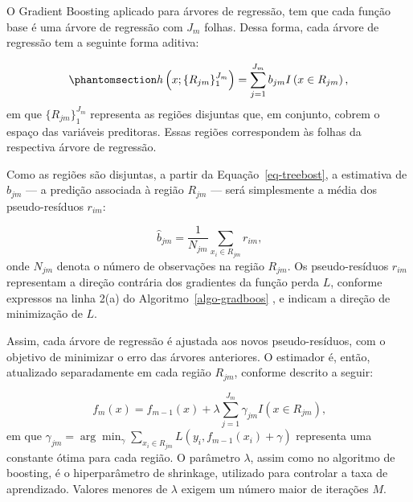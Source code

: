 \documentclass[
  12pt,
  a4paper,
]{scrreprt}
\begin{document}
\vspace{12pt}

O Gradient Boosting aplicado para árvores de regressão, tem que cada
função base é uma árvore de regressão com \(J_m\) folhas. Dessa forma,
cada árvore de regressão tem a seguinte forma aditiva:

\begin{equation}\phantomsection\label{eq-treebost}{
h\left(x;\{R_{jm}\}^{J_{m}}_{1}\right) = \sum^{J_m}_{j = 1} b_{jm} I\left(x \in R_{jm}\right)\text{,}
}\end{equation} em que \(\{R_{jm}\}^{J_m}_{1}\) representa as regiões
disjuntas que, em conjunto, cobrem o espaço das variáveis preditoras.
Essas regiões correspondem às folhas da respectiva árvore de regressão.

\vspace{12pt}

Como as regiões são disjuntas, a partir da Equação~\ref{eq-treebost}, a
estimativa de \(b_{jm}\) --- a predição associada à região
\(R_{jm}\)\hspace{0pt} --- será simplesmente a média dos pseudo-resíduos
\(r_{im}\):

\[
\hat{b}_{jm} = \frac{1}{N_{jm}} \sum_{x_i \in R_{jm}} r_{im}\text{,}
\] onde \(N_{jm}\) denota o número de observações na região \(R_{jm}\).
Os pseudo-resíduos \(r_{im}\)\hspace{0pt} representam a direção
contrária dos gradientes da função perda \(L\), conforme expressos na
linha 2(a) do  Algoritmo~\ref{algo-gradboos} , e indicam a direção de
minimização de \(L\).

\vspace{12pt}

Assim, cada árvore de regressão é ajustada aos novos pseudo-resíduos,
com o objetivo de minimizar o erro das árvores anteriores. O estimador
é, então, atualizado separadamente em cada região
\(R_{jm}\)\hspace{0pt}, conforme descrito a seguir:

\[
f_m\left(x\right) = f_{m - 1}\left(x\right) + \lambda \sum^{J_m}_{j = 1} \gamma_{jm} I\left(x \in R_{jm}\right)\text{,}
\] em que
\(\gamma_{jm} = \arg \min_{\gamma} \sum_{x_i \in R_{jm}} L\left(y_i, f_{m - 1}\left(x_i\right) + \gamma\right)\)
representa uma constante ótima para cada região. O parâmetro
\(\lambda\), assim como no algoritmo de boosting, é o hiperparâmetro de
shrinkage, utilizado para controlar a taxa de aprendizado. Valores
menores de \(\lambda\) exigem um número maior de iterações \(M\).
\end{document}
